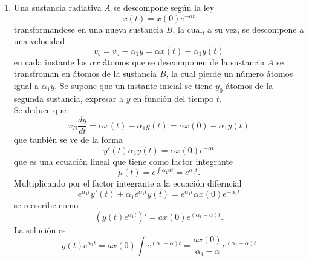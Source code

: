 \documentclass[10pt,a4paper,notitlepage]{report}
\begin{document}
\begin{itemize}
\begin{enumerate}
integrando
\begin{equation}
- In |B - y| = kt + c
\end{equation}
al ser $B - y > 0$, se puede quitar el valor absoluto, nos queda
\begin{equation}
-In (B - y) & = & kt + c \Rightarrow In (B - y) = -kt - c \nonumber \\
B - y = e^{-kt -c} & = & e^{-kt}e^{-c} \Rightarrow y(t) = B - e^{-c}e^{-kt}.
\end{equation}
\Large
\item Una sustancia radiativa $A$ se descompone según la ley 
\begin{equation}
x(t) = x(0) e^{- \alpha t}
\end{equation}
transformandose en una nueva sustancia $B$, la cual, a su vez, se descompone a una velocidad
\begin{equation}
v_{b} = v_{a} - \alpha_{1} y =  \alpha x (t) - \alpha_{1} y(t)
\end{equation}
en cada instante los $\alpha x$ átomos que se descomponen de la sustancia $A$ se transfroman en átomos de la sustancia $B$, la cual pierde un número átomos igual a $\alpha_{1} y$. Se supone que un instante inicial se tiene $y_{0}$ átomos  de la segunda sustancia, expresar a $y$ en función del tiempo $t$. \\
\large
Se deduce que
\begin{equation}
v_{B} \frac{dy}{dt} = \alpha x(t) - \alpha_{1} y(t) = \alpha x(0) - \alpha_{1} y(t)
\end{equation}
que tanbién se ve de la forma
\begin{equation}
y'(t) \alpha_{1} y(t) = \alpha x(0) e^{- \alpha t}
\end{equation}
que es una ecuación lineal que tiene como factor integrante
\begin{equation}
\mu (t) = e^{\int \alpha_{1} dt} = e^{\alpha_{1} t}.
\end{equation}
Multiplicando por el factor integrante a la ecuación diferncial
\begin{equation}
e^{\alpha_{1} t}y'(t) + \alpha_{1} e^{\alpha_{1} t} y(t) = e^{\alpha_{1} t} \alpha x(0) e^{-\alpha_{1} t}
\end{equation}
se reescribe como
\begin{equation}
(y(t) e^{\alpha_{1} t})' = a x(0) e^{(\alpha_{1} - \alpha) t}.
\end{equation}
La solución es 
\begin{equation}
y(t) e^{\alpha_{1} t} = ax(0) \int e^{(\alpha_{1} - \alpha) t} = \frac{ax(0)}{\alpha_{1} - \alpha} e^{(\alpha_{1} - \alpha) t}

\end{equation}
\end{enumerate}
\end{itemize}
\end{document}

